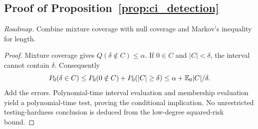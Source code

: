 \subsection{Proof of Proposition~\ref{prop:ci_detection}}
\noindent\emph{Roadmap.} Combine mixture coverage with null coverage and Markov's inequality for length.
\begin{proof}
Mixture coverage gives $Q(\delta\notin C)\le\alpha$.
If $0\in C$ and $|C|<\delta$, the interval cannot contain $\delta$.
Consequently
\[
 P_0(\delta\in C)\le P_0(0\notin C)+P_0(|C|\ge\delta)
 \le\alpha+\mathbb E_0|C|/\delta.
\]
Add the errors. Polynomial-time interval evaluation and membership evaluation yield a polynomial-time test, proving the conditional implication.
No unrestricted testing-hardness conclusion is deduced from the low-degree squared-risk bound.
\end{proof}
